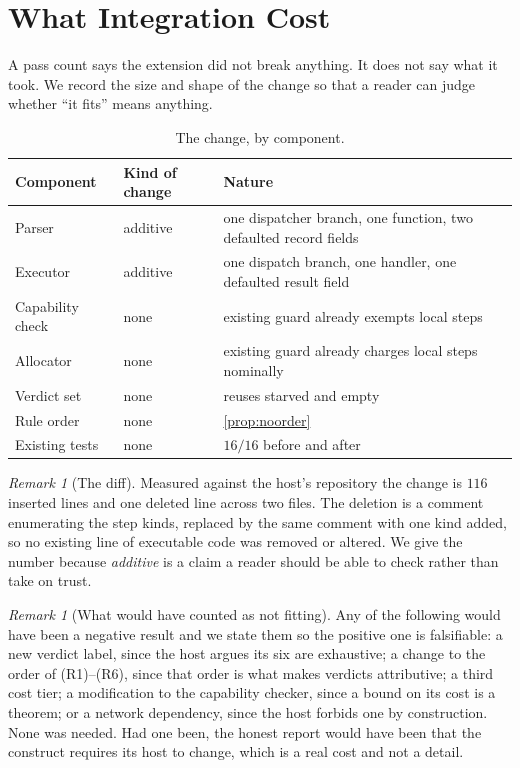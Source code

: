 \documentclass[11pt,twocolumn,a4paper]{article}
\theoremstyle{plain}
\theoremstyle{definition}
\theoremstyle{remark}
\newtheorem{remark}[theorem]{Remark}
\newcommand{\vempty}{\textsf{empty}}
\newcommand{\vstarve}{\textsf{starved}}
\begin{document}
\section{What Integration Cost}
\label{sec:cost-of-integration}

A pass count says the extension did not break anything. It does not say what it
took. We record the size and shape of the change so that a reader can judge
whether ``it fits'' means anything.

\begin{table}[!htbp]
\centering
\caption{The change, by component.}
\label{tab:diff}
\begin{tabular}{lll}
\toprule
Component & Kind of change & Nature \\
\midrule
Parser            & additive & one dispatcher branch, one function, two
                               defaulted record fields \\
Executor          & additive & one dispatch branch, one handler, one
                               defaulted result field \\
Capability check  & none     & existing guard already exempts local steps \\
Allocator         & none     & existing guard already charges local steps
                               nominally \\
Verdict set       & none     & reuses \vstarve{} and \vempty \\
Rule order        & none     & \cref{prop:noorder} \\
Existing tests    & none     & $16/16$ before and after \\
\bottomrule
\end{tabular}
\end{table}

\begin{remark}[The diff]
\label{rem:diff}
Measured against the host's repository the change is $116$ inserted lines
and one deleted line across two files. The deletion is a comment
enumerating the step kinds, replaced by the same comment with one kind
added, so no existing line of executable code was removed or altered. We
give the number because \emph{additive} is a claim a reader should be able
to check rather than take on trust.
\end{remark}

\begin{remark}[What would have counted as not fitting]
\label{rem:notfitting}
Any of the following would have been a negative result and we state them so the
positive one is falsifiable: a new verdict label, since the host argues its six
are exhaustive; a change to the order of (R1)--(R6), since that order is what
makes verdicts attributive; a third cost tier; a modification to the capability
checker, since a bound on its cost is a theorem; or a network dependency, since
the host forbids one by construction. None was needed. Had one been, the
honest report would have been that the construct requires its host to change,
which is a real cost and not a detail.
\end{remark}
\end{document}
